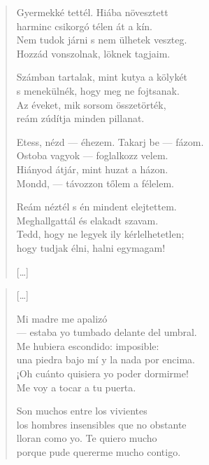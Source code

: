 \documentclass[11pt]{extbook}
\newcommand*{\centeredornament}{\centerline{\pgfornament[width=6cm]{88}}}
\begin{document}
\begin{verse}
  Gyermekké tettél. Hiába növesztett \\
  harminc csikorgó télen át a kín. \\
  Nem tudok járni s nem ülhetek veszteg. \\
  Hozzád vonszolnak, löknek tagjaim.

  Számban tartalak, mint kutya a kölykét \\
  s menekülnék, hogy meg ne fojtsanak. \\
  Az éveket, mik sorsom összetörték, \\
  reám zúdítja minden pillanat.

  Etess, nézd --- éhezem. Takarj be --- fázom. \\
  Ostoba vagyok --- foglalkozz velem. \\
  Hiányod átjár, mint huzat a házon. \\
  Mondd, --- távozzon tőlem a félelem.

  Reám néztél s én mindent elejtettem. \\
  Meghallgattál és elakadt szavam. \\
  Tedd, hogy ne legyek ily kérlelhetetlen; \\
  hogy tudjak élni, halni egymagam!

  \hfill [\ldots]
\end{verse}

\newpage


\vspace*{-15mm}
\centeredornament


\poemtitle*{\phantom{Me convertiste en un niño}}

\begin{verse}
  \textnormal{[\ldots]}

  Mi madre me apalizó \\
  --- estaba yo tumbado delante del umbral. \\
  Me hubiera escondido: imposible: \\
  una piedra bajo mí y la nada por encima. \\
  ¡Oh cuánto quisiera yo poder dormirme! \\
  Me voy a tocar a tu puerta.

  Son muchos entre los vivientes \\
  los hombres insensibles que no obstante \\
  lloran como yo. Te quiero mucho \\
  porque pude quererme mucho contigo.
\end{verse}
\end{document}
